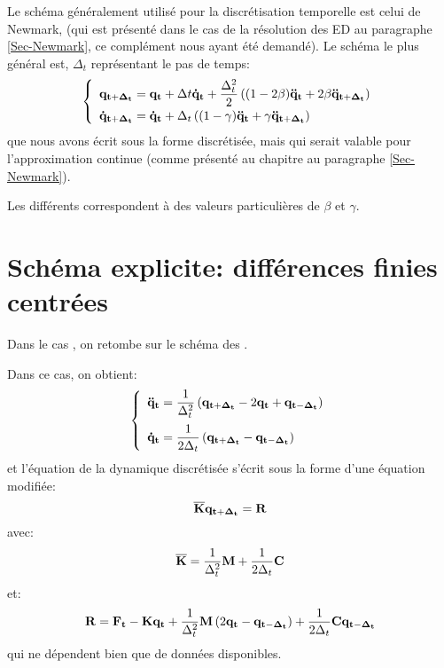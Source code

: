 \medskip
Le schéma généralement utilisé pour la discrétisation temporelle est celui de Newmark,
(qui est présenté dans le cas de la résolution des ED au paragraphe \ref{Sec-Newmark}, 
ce complément nous ayant été demandé).
Le schéma le plus général est, $\Delta_t$ représentant le pas de temps:
\begin{equation}\colorblue
\left\{
\begin{array}{l}\displaystyle
\VV{q_{t+\Delta_t}} = \VV{q_t} + \Delta t \VV{\dot q_t} + \frac{\Delta_t^2}2\left((1-2\beta)\VV{\ddot q_t}
+2\beta\VV{\ddot q_{t+\Delta_t}}\right) \\[+2mm] 
\displaystyle
\VV{\dot q_{t+\Delta_t}} = \VV{\dot q_t}+\Delta_t\left((1-\gamma)\VV{\ddot q_t} + \gamma\VV{\ddot q_{t+\Delta_t}}
\right)
\end{array}
\right.
\end{equation}
que nous avons écrit sous la forme discrétisée, mais qui serait valable pour l'approximation
continue (comme présenté au chapitre au paragraphe \ref{Sec-Newmark}).

Les différents  
correspondent à des valeurs particulières de $\beta$ et $\gamma$.



\bigskip
\section{Schéma explicite: différences finies centrées}

Dans le cas , on retombe sur le schéma des .

Dans ce cas, on obtient:
\begin{equation}\colorgreen
\left\{
\begin{array}{l}\displaystyle
\VV{\ddot q_t} = \frac1{\Delta_t^2} \left( \VV{q_{t+\Delta_t}} - 2\VV{q_t} + \VV{q_{t-\Delta_t}}\right)\\[+4mm] \displaystyle
\VV{\dot q_t} =  \frac1{2\Delta_t}\left( \VV{q_{t+\Delta_t}} - \VV{q_{t-\Delta_t}}\right)
\end{array}
\right.
\end{equation}
et l'équation de la dynamique discrétisée s'écrit sous la forme d'une équation modifiée:
\begin{equation}\colorblue
\MM{\overline{K}} \VV{q_{t+\Delta_t}} = \VV{R}
\end{equation}
avec:
\begin{equation}\colorgreen
\MM{\overline{K}} = \frac1{\Delta_t^2}\MM{M}+\frac1{2\Delta_t}\MM{C}
\end{equation}
et:
\begin{equation}\colorgreen
\VV{R} = \VV{F_t} -\MM{K}\VV{q_t} + \frac1{\Delta_t^2}\MM{M}\left( 2\VV{q_t} -\VV{q_{t-\Delta_t}}\right)
+\frac1{2\Delta_t}\MM{C}\VV{q_{t-\Delta_t}}
\end{equation}
qui ne dépendent bien que de données disponibles.

